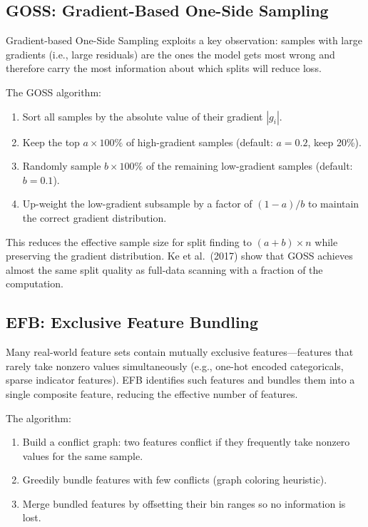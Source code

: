 \subsection{GOSS: Gradient-Based One-Side Sampling}

Gradient-based One-Side Sampling exploits a key observation: samples with large gradients (i.e., large residuals) are the ones the model gets most wrong and therefore carry the most information about which splits will reduce loss.

The GOSS algorithm:
\begin{enumerate}[nosep]
  \item Sort all samples by the absolute value of their gradient $|g_i|$.
  \item Keep the top $a \times 100\%$ of high-gradient samples (default: $a = 0.2$, keep 20\%).
  \item Randomly sample $b \times 100\%$ of the remaining low-gradient samples (default: $b = 0.1$).
  \item Up-weight the low-gradient subsample by a factor of $(1 - a)/b$ to maintain the correct gradient distribution.
\end{enumerate}

This reduces the effective sample size for split finding to $(a + b) \times n$ while preserving the gradient distribution.
Ke et al.\ (2017) show that GOSS achieves almost the same split quality as full-data scanning with a fraction of the computation.

\subsection{EFB: Exclusive Feature Bundling}

Many real-world feature sets contain mutually exclusive features---features that rarely take nonzero values simultaneously (e.g., one-hot encoded categoricals, sparse indicator features).
EFB identifies such features and bundles them into a single composite feature, reducing the effective number of features.

The algorithm:
\begin{enumerate}[nosep]
  \item Build a conflict graph: two features conflict if they frequently take nonzero values for the same sample.
  \item Greedily bundle features with few conflicts (graph coloring heuristic).
  \item Merge bundled features by offsetting their bin ranges so no information is lost.
\end{enumerate}

